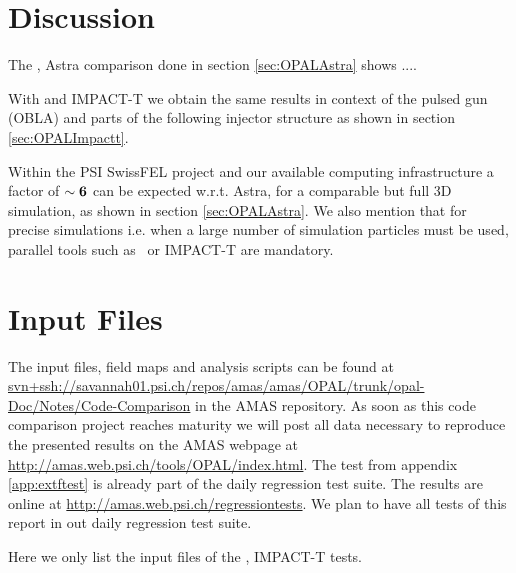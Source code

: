 \documentclass{psi-note}    %
\begin{document}
{%
\clearpage
\section{Discussion}

The \opalt, Astra comparison done in section \ref{sec:OPALAstra} shows ....

With \opalt and IMPACT-T we obtain the same results in context of the pulsed
gun (OBLA) and parts of the following injector structure as shown in section
\ref{sec:OPALImpactt}.

Within the PSI SwissFEL project and our available computing infrastructure a    
factor of $\sim \bf 6$ can be expected w.r.t. Astra, for a comparable but full  
3D simulation, as shown in section \ref{sec:OPALAstra}. We also mention that    
for precise simulations i.e. when a large number of simulation particles must   
be used, parallel tools such as \opal\ or IMPACT-T are mandatory.               


\appendix
\section{Input Files}
The input files, field maps and analysis scripts can be found at 
\url{svn+ssh://savannah01.psi.ch/repos/amas/amas/OPAL/trunk/opal-Doc/Notes/Code-Comparison} in the AMAS repository. As soon as this code comparison project reaches
maturity we will post all data necessary to reproduce the presented results on
the AMAS webpage at \url{http://amas.web.psi.ch/tools/OPAL/index.html}. The test
from appendix \ref{app:extftest} is already part of the daily regression test
suite. The results are online at \url{http://amas.web.psi.ch/regressiontests}.
We plan to have all tests of this report in out daily regression test suite.

Here we only list the input files of the \opal, IMPACT-T tests.

}
\end{document}
